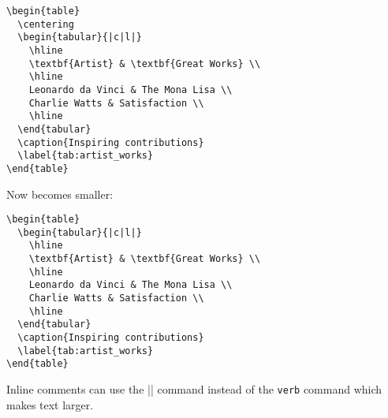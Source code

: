 \documentclass[pagesize=auto]{scrbook}
\begin{document}
\begin{verbatim}
\begin{table}
  \centering
  \begin{tabular}{|c|l|}
    \hline
    \textbf{Artist} & \textbf{Great Works} \\
    \hline
    Leonardo da Vinci & The Mona Lisa \\
    Charlie Watts & Satisfaction \\
    \hline
  \end{tabular}
  \caption{Inspiring contributions}
  \label{tab:artist_works}
\end{table}
\end{verbatim}

Now becomes smaller:

\begin{Verbatim}[fontsize=\footnotesize]
  \begin{table}
  \begin{tabular}{|c|l|}
    \hline
    \textbf{Artist} & \textbf{Great Works} \\
    \hline
    Leonardo da Vinci & The Mona Lisa \\
    Charlie Watts & Satisfaction \\
    \hline
  \end{tabular}
  \caption{Inspiring contributions}
  \label{tab:artist_works}
\end{table}
\end{Verbatim}

Inline comments can use the \sverb|\sverb| command instead of the \verb|verb| command which makes text larger.
\end{document}
